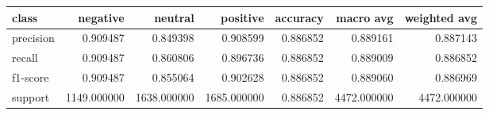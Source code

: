\begin{tabular}{lrrrrrr}
\toprule
class & negative & neutral & positive & accuracy & macro avg & weighted avg \\
\midrule
precision & 0.909487 & 0.849398 & 0.908599 & 0.886852 & 0.889161 & 0.887143 \\
recall & 0.909487 & 0.860806 & 0.896736 & 0.886852 & 0.889009 & 0.886852 \\
f1-score & 0.909487 & 0.855064 & 0.902628 & 0.886852 & 0.889060 & 0.886969 \\
support & 1149.000000 & 1638.000000 & 1685.000000 & 0.886852 & 4472.000000 & 4472.000000 \\
\bottomrule
\end{tabular}
